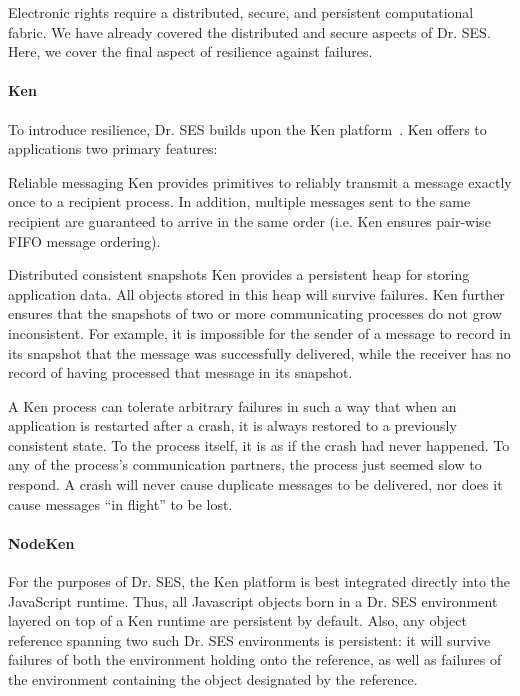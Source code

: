 \documentclass{llncs}
\begin{document}
Electronic rights require a distributed, secure, and persistent computational fabric.
We have already covered the distributed and secure aspects of Dr. SES. Here, we cover the final aspect of resilience against failures.

\paragraph{Ken}

To introduce resilience, Dr. SES builds upon the Ken platform~\cite{Yoo:CKen}. Ken offers to applications two primary features:

\begin{description*}
  \item[Reliable messaging] Ken provides primitives to reliably transmit a message exactly once to a recipient process. In addition, multiple messages sent to the same recipient are guaranteed to arrive in the same order (i.e. Ken ensures pair-wise FIFO message ordering).
  \item[Distributed consistent snapshots] Ken provides a persistent heap for storing application data. All objects stored in this heap will survive failures. Ken further ensures that the snapshots of two or more communicating processes do not grow inconsistent. For example, it is impossible for the sender of a message to record in its snapshot that the message was successfully delivered, while the receiver has no record of having processed that message in its snapshot.
\end{description*}

A Ken process can tolerate arbitrary failures in such a way that when an application is restarted after a crash, it is always restored to a previously consistent state. To the process itself, it is as if the crash had never happened. To any of the process's communication partners, the process just seemed slow to respond. A crash will never cause duplicate messages to be delivered, nor does it cause messages ``in flight'' to be lost.

\paragraph{NodeKen}

For the purposes of Dr. SES, the Ken platform is best integrated directly into the JavaScript runtime. Thus, all Javascript objects born in a Dr. SES environment layered on top of a Ken runtime are persistent by default. Also, any object reference spanning two such Dr. SES environments is persistent: it will survive failures of both the environment holding onto the reference, as well as failures of the environment containing the object designated by the reference.
\end{document}
